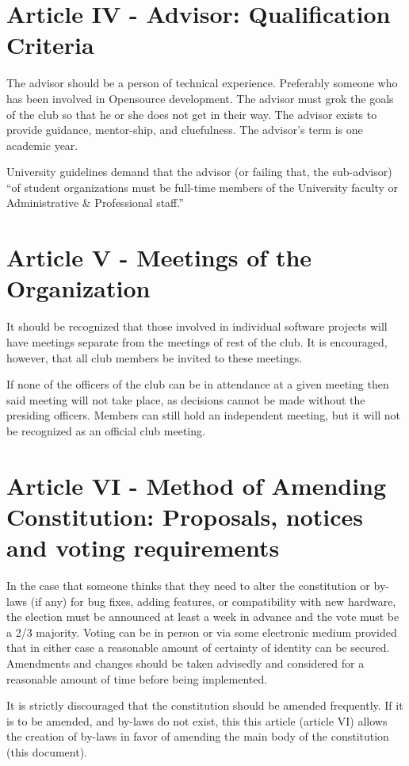 \documentclass{article}
\begin{document}
	\section{Article IV - Advisor: Qualification Criteria}

	The advisor should be a person of technical experience. Preferably someone who has been involved in Opensource development. The advisor must grok the goals of the club so that he or she does not get in their way. The advisor exists to provide guidance, mentor-ship, and cluefulness. The advisor's term is one academic year.

	University guidelines demand that the advisor (or failing that, the sub-advisor) ``of student organizations must be full-time members of the University faculty or Administrative \& Professional staff.''

	\section{Article V - Meetings of the Organization}

	It should be recognized that those involved in individual software projects will have meetings separate from the meetings of rest of the club. It is encouraged, however, that all club members be invited to these meetings.

	If none of the officers of the club can be in attendance at a given meeting then said meeting will not take place, as decisions cannot be made without the presiding officers. Members can still hold an independent meeting, but it will not be recognized as an official club meeting.

	\section{Article VI - Method of Amending Constitution: Proposals, notices and voting requirements}

	In the case that someone thinks that they need to alter the constitution or by-laws (if any) for bug fixes, adding features, or compatibility with new hardware, the election must be announced at least a week in advance and the vote must be a 2/3 majority. Voting can be in person or via some electronic medium provided that in either case a reasonable amount of certainty of identity can be secured. Amendments and changes should be taken advisedly and considered for a reasonable amount of time before being implemented.

	It is strictly discouraged that the constitution should be amended frequently. If it is to be amended, and by-laws do not exist, this this article (article VI) allows the creation of by-laws in favor of amending the main body of the constitution (this document).
\end{document}
